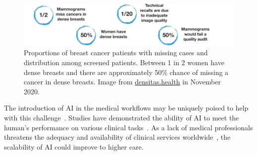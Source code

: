 \begin{figure}[ht]
\centering
\includegraphics[width=\textwidth]{images/fig016}
\caption{Proportions of breast cancer patients with missing cases and distribution among screened patients. Between 1 in 2 women have dense breasts and there are approximately 50\% chance of missing a cancer in dense breasts. Image from \protect\href{https://densitas.health/about}{densitas.health} in November 2020.}
\label{fig:fig016}
\end{figure}



The introduction of \ac{AI} in the medical workflows may be uniquely poised to help with this challenge~\cite{McKinney2020}.
Studies have demonstrated the ability of \ac{AI} to meet the human's performance on various clinical tasks~\cite{Topol2019, info:doi/10.2196/10010}.
As a lack of medical professionals threatens the adequacy and availability of clinical services worldwide~\cite{doi:10.1002/j.2051-3909.2012.tb00169.x, rimmer2017radiologist}, the scalability of \ac{AI} could improve to higher care.

